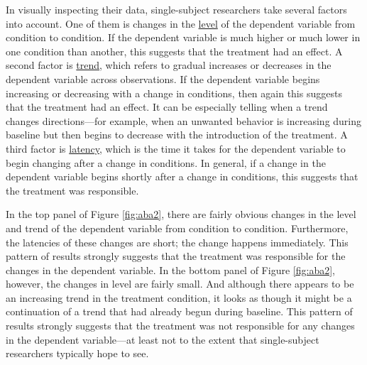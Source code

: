 \documentclass[
]{krantz}
\begin{document}
In visually inspecting their data, single-subject researchers take several factors into account. One of them is changes in the \protect\hyperlink{level}{level} of the dependent variable from condition to condition. If the dependent variable is much higher or much lower in one condition than another, this suggests that the treatment had an effect. A second factor is \protect\hyperlink{trend}{trend}, which refers to gradual increases or decreases in the dependent variable across observations. If the dependent variable begins increasing or decreasing with a change in conditions, then again this suggests that the treatment had an effect. It can be especially telling when a trend changes directions---for example, when an unwanted behavior is increasing during baseline but then begins to decrease with the introduction of the treatment. A third factor is \protect\hyperlink{latency}{latency}, which is the time it takes for the dependent variable to begin changing after a change in conditions. In general, if a change in the dependent variable begins shortly after a change in conditions, this suggests that the treatment was responsible.

In the top panel of Figure \ref{fig:aba2}, there are fairly obvious changes in the level and trend of the dependent variable from condition to condition. Furthermore, the latencies of these changes are short; the change happens immediately. This pattern of results strongly suggests that the treatment was responsible for the changes in the dependent variable. In the bottom panel of Figure \ref{fig:aba2}, however, the changes in level are fairly small. And although there appears to be an increasing trend in the treatment condition, it looks as though it might be a continuation of a trend that had already begun during baseline. This pattern of results strongly suggests that the treatment was not responsible for any changes in the dependent variable---at least not to the extent that single-subject researchers typically hope to see.
\end{document}
